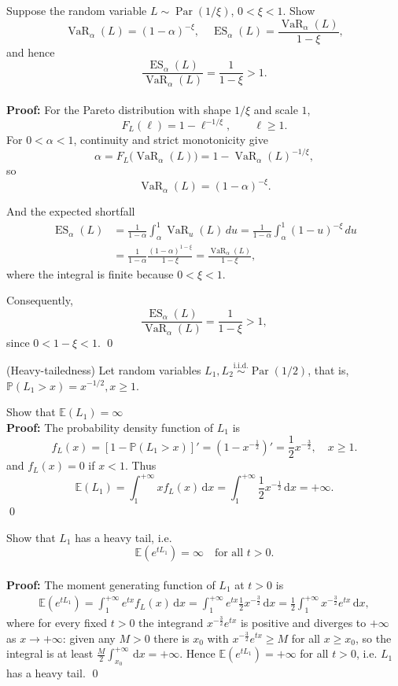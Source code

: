 \documentclass{MFM-hw} %
\newcommand{\VaR}{\operatorname{VaR}}
\newcommand{\ES}{\operatorname{ES}}
\newcommand{\dd}{\,\mathrm{d}}
\newcommand{\E}{\mathbb{E}}
\newcommand{\Par}{\operatorname{Par}}
\renewcommand{\P}{\mathbb{P}}
\begin{document}
\HWproblem
Suppose the random variable $L \sim \Par(1/\xi)$, $0 < \xi < 1$. Show
\[
    \VaR_{\alpha}(L) = (1-\alpha)^{-\xi}, \quad \ES_{\alpha}(L) = \frac{\VaR_{\alpha}(L)}{1-\xi},
\]
and hence
\[
    \frac{\ES_{\alpha}(L)}{\VaR_{\alpha}(L)} = \frac{1}{1-\xi} > 1.
\]\\

\textbf{Proof:} For the Pareto distribution with shape \(1/\xi\) and scale \(1\),
\[
F_L(\ell)=1-\ell^{-1/\xi},\qquad \ell\ge1.
\]
For \(0<\alpha<1\), continuity and strict monotonicity give
\[
\alpha=F_L\bigl(\VaR_\alpha(L)\bigr)
=1-\VaR_\alpha(L)^{-1/\xi},
\]
so
\[
\VaR_\alpha(L)=(1-\alpha)^{-\xi}.
\]

And the expected shortfall
\[
\begin{aligned}
\ES_\alpha(L)
&=\frac{1}{1-\alpha}\int_\alpha^1\VaR_u(L)\,du=\frac{1}{1-\alpha}\int_\alpha^1(1-u)^{-\xi}\,du\\
&=\frac{1}{1-\alpha}\frac{(1-\alpha)^{1-\xi}}{1-\xi} = \frac{\VaR_\alpha(L)}{1-\xi},
\end{aligned}
\]
where the integral is finite because \(0<\xi<1\).

Consequently,
\[
\frac{\ES_\alpha(L)}{\VaR_\alpha(L)}
=\frac{1}{1-\xi}>1,
\]
since \(0<1-\xi<1\). \qed

\HWproblem
(Heavy-tailedness) Let random variables $L_1,L_2 \stackrel{\text{i.i.d.}}{\sim} \Par(1/2)$, that is, $\P(L_1 > x) = x^{-1/2}, x \ge 1$.

\HWsubproblem
Show that $\E(L_1) = \infty$\\

\textbf{Proof: } The probability density function of $L_1$ is
\[
    f_L(x) = [1-\P(L_1 > x)]' = (1-x^{-\frac12})' = \frac12 x^{-{\frac32}}, \quad x\ge 1.
\]
and $f_L(x) = 0$ if $x < 1$. Thus
\[
    \E(L_1) = \int_1^{+\infty} xf_L(x) \dd x =\int_1^{+\infty} \frac12 x^{-\frac12} \dd x = + \infty.
\]\qed

\HWsubproblem
Show that $L_1$ has a heavy tail, i.e.
\[
    \E(e^{tL_1}) = \infty \quad \text{for all } t>0.
\]\\

\textbf{Proof: }The moment generating function of $L_1$ at $t>0$ is
\begin{align*}
    \E(e^{tL_1}) = \int_1^{+\infty} e^{tx} f_L(x) \dd x = \int_1^{+\infty} e^{tx} \frac12x^{-\frac{3}{2}}\dd x = \frac12 \int_1^{+\infty} x^{-\frac32}e^{tx}\dd x,
\end{align*}
where for every fixed $t>0$ the integrand $x^{-\frac32}e^{tx}$ is positive and diverges to $+\infty$ as $x \rightarrow +\infty$: given any $M>0$ there is $x_0$ with $x^{-\frac32}e^{tx} \ge M$ for all $x \ge x_0$, so the integral is at least $\frac{M}{2}\int_{x_0}^{+\infty}\dd x = +\infty$. Hence $\E(e^{tL_1}) = +\infty$ for all $t>0$, i.e. $L_1$ has a heavy tail. \qed \\
\end{document}
